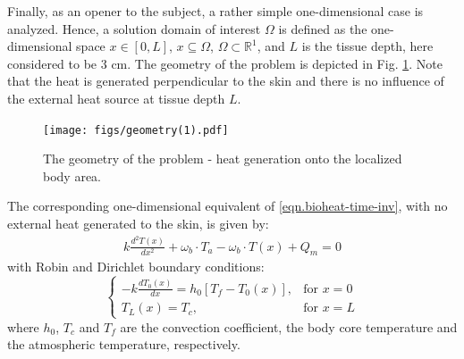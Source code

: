 \documentclass[conference]{IEEEtran}
\begin{document}
Finally, as an opener to the subject, a rather simple one-dimensional case is analyzed. Hence, a solution domain of interest $\Omega$ is defined as the one-dimensional space $x \in [0, L]$, $x \subseteq \Omega$, $\Omega \subset \mathbb R^1$, and $L$ is the tissue depth, here considered to be 3 cm. The geometry of the problem is depicted in Fig. \ref{fig.geometry}. Note that the heat is generated perpendicular to the skin and there is no influence of the external heat source at tissue depth $L$.
\begin{figure}[]
\centering
 \texttt{[image: figs/geometry(1).pdf]}
\caption{The geometry of the problem - heat generation onto the localized body area.}
\label{fig.geometry}
\end{figure}
The corresponding one-dimensional equivalent of \eqref{eqn.bioheat-time-inv}, with no external heat generated to the skin, is given by:
\begin{equation}
\begin{aligned}
k \frac{d^2 T(x)}{dx^2} + \omega_b \cdot T_a - \omega_b \cdot T(x) + Q_m = 0
\end{aligned}
\label{eqn.bioheat-1d-time-inv}
\end{equation}
with Robin and Dirichlet boundary conditions:
\begin{equation}
    \begin{cases} 
    -k \frac{dT_0(x)}{dx} = h_0[T_f - T_0(x)],& \mbox{for } x=0 \\ 
    T_L(x) = T_c,& \mbox{for } x=L
    \end{cases}
\label{eqn.bcs}
\end{equation}
where $h_0$, $T_c$ and $T_f$ are the convection coefficient, the body core temperature and the atmospheric temperature, respectively. 
\end{document}
